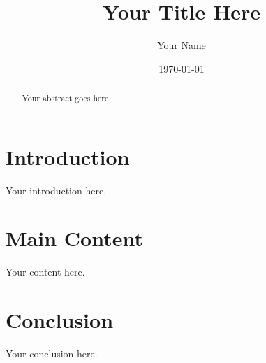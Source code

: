 \documentclass[11pt,a4paper]{article}
\title{Your Title Here}
\author{Your Name}
\date{\today}
\begin{document}
\maketitle

\begin{abstract}
Your abstract goes here.
\end{abstract}

\section{Introduction}
Your introduction here.

\section{Main Content}
Your content here.

\section{Conclusion}
Your conclusion here.
\end{document}
